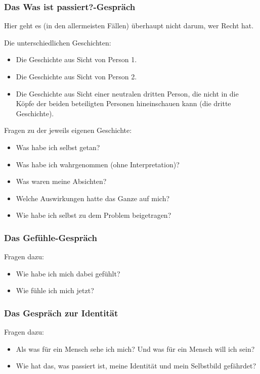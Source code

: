 \subsubsection{Das \glqq Was ist passiert?\grqq-Gespräch}

Hier geht es (in den allermeisten Fällen) überhaupt nicht darum, wer \glqq Recht hat\grqq.

Die unterschiedlichen Geschichten:

\begin{itemize}
  \item Die Geschichte aus Sicht von Person 1.
  \item Die Geschichte aus Sicht von Person 2.
  \item Die Geschichte aus Sicht einer neutralen dritten Person, die nicht in die Köpfe der beiden beteiligten Personen hineinschauen kann (\glqq die dritte Geschichte\grqq).
\end{itemize}

Fragen zu der jeweils eigenen Geschichte:

\begin{itemize}
  \item Was habe ich selbst getan?
  \item Was habe ich wahrgenommen (ohne Interpretation)?
  \item Was waren meine Absichten?
  \item Welche Auswirkungen hatte das Ganze auf mich?
  \item Wie habe ich selbst zu dem Problem beigetragen?
\end{itemize}


\subsubsection{Das Gefühle-Gespräch}

Fragen dazu:

\begin{itemize}
  \item Wie habe ich mich dabei gefühlt?
  \item Wie fühle ich mich jetzt?
\end{itemize}

\subsubsection{Das Gespräch zur Identität}

Fragen dazu:

\begin{itemize}
  \item Als was für ein Mensch sehe ich mich? Und was für ein Mensch will ich sein?
  \item Wie hat das, was passiert ist, meine Identität und mein Selbstbild gefährdet?
\end{itemize}


